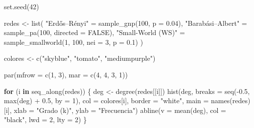 \documentclass[
  letterpaper,
  DIV=11,
  numbers=noendperiod]{scrreprt}
\newenvironment{Shaded}{\begin{snugshade}}{\end{snugshade}}
\newcommand{\AttributeTok}[1]{\textcolor[rgb]{0.40,0.45,0.13}{#1}}
\newcommand{\ConstantTok}[1]{\textcolor[rgb]{0.56,0.35,0.01}{#1}}
\newcommand{\ControlFlowTok}[1]{\textcolor[rgb]{0.00,0.23,0.31}{\textbf{#1}}}
\newcommand{\DecValTok}[1]{\textcolor[rgb]{0.68,0.00,0.00}{#1}}
\newcommand{\FloatTok}[1]{\textcolor[rgb]{0.68,0.00,0.00}{#1}}
\newcommand{\FunctionTok}[1]{\textcolor[rgb]{0.28,0.35,0.67}{#1}}
\newcommand{\NormalTok}[1]{\textcolor[rgb]{0.00,0.23,0.31}{#1}}
\newcommand{\OtherTok}[1]{\textcolor[rgb]{0.00,0.23,0.31}{#1}}
\newcommand{\SpecialCharTok}[1]{\textcolor[rgb]{0.37,0.37,0.37}{#1}}
\newcommand{\StringTok}[1]{\textcolor[rgb]{0.13,0.47,0.30}{#1}}
\begin{document}
\begin{Shaded}
\begin{Highlighting}[]
\FunctionTok{set.seed}\NormalTok{(}\DecValTok{42}\NormalTok{)}

\NormalTok{redes }\OtherTok{\textless{}{-}} \FunctionTok{list}\NormalTok{(}
  \StringTok{"Erdős–Rényi"}     \OtherTok{=} \FunctionTok{sample\_gnp}\NormalTok{(}\DecValTok{100}\NormalTok{, }\AttributeTok{p =} \FloatTok{0.04}\NormalTok{),}
  \StringTok{"Barabási–Albert"}  \OtherTok{=} \FunctionTok{sample\_pa}\NormalTok{(}\DecValTok{100}\NormalTok{, }\AttributeTok{directed =} \ConstantTok{FALSE}\NormalTok{),}
  \StringTok{"Small{-}World (WS)"} \OtherTok{=} \FunctionTok{sample\_smallworld}\NormalTok{(}\DecValTok{1}\NormalTok{, }\DecValTok{100}\NormalTok{, }\AttributeTok{nei =} \DecValTok{3}\NormalTok{, }\AttributeTok{p =} \FloatTok{0.1}\NormalTok{)}
\NormalTok{)}
\end{Highlighting}
\end{Shaded}

\begin{Shaded}
\begin{Highlighting}[]
\NormalTok{colores }\OtherTok{\textless{}{-}} \FunctionTok{c}\NormalTok{(}\StringTok{"skyblue"}\NormalTok{, }\StringTok{"tomato"}\NormalTok{, }\StringTok{"mediumpurple"}\NormalTok{)}

\FunctionTok{par}\NormalTok{(}\AttributeTok{mfrow =} \FunctionTok{c}\NormalTok{(}\DecValTok{1}\NormalTok{, }\DecValTok{3}\NormalTok{), }\AttributeTok{mar =} \FunctionTok{c}\NormalTok{(}\DecValTok{4}\NormalTok{, }\DecValTok{4}\NormalTok{, }\DecValTok{3}\NormalTok{, }\DecValTok{1}\NormalTok{))}

\ControlFlowTok{for}\NormalTok{ (i }\ControlFlowTok{in} \FunctionTok{seq\_along}\NormalTok{(redes)) \{}
\NormalTok{  deg }\OtherTok{\textless{}{-}} \FunctionTok{degree}\NormalTok{(redes[[i]])}
  \FunctionTok{hist}\NormalTok{(deg,}
       \AttributeTok{breaks =} \FunctionTok{seq}\NormalTok{(}\SpecialCharTok{{-}}\FloatTok{0.5}\NormalTok{, }\FunctionTok{max}\NormalTok{(deg) }\SpecialCharTok{+} \FloatTok{0.5}\NormalTok{, }\AttributeTok{by =} \DecValTok{1}\NormalTok{),}
       \AttributeTok{col =}\NormalTok{ colores[i], }\AttributeTok{border =} \StringTok{"white"}\NormalTok{,}
       \AttributeTok{main =} \FunctionTok{names}\NormalTok{(redes)[i],}
       \AttributeTok{xlab =} \StringTok{"Grado (k)"}\NormalTok{, }\AttributeTok{ylab =} \StringTok{"Frecuencia"}\NormalTok{)}
  \FunctionTok{abline}\NormalTok{(}\AttributeTok{v =} \FunctionTok{mean}\NormalTok{(deg), }\AttributeTok{col =} \StringTok{"black"}\NormalTok{, }\AttributeTok{lwd =} \DecValTok{2}\NormalTok{, }\AttributeTok{lty =} \DecValTok{2}\NormalTok{)}
\NormalTok{\}}
\end{Highlighting}
\end{Shaded}
\end{document}

